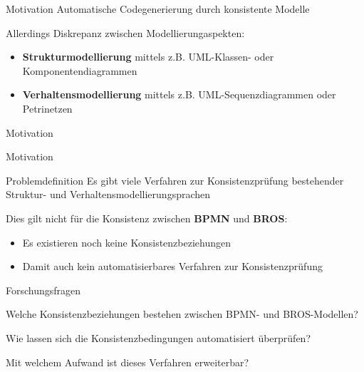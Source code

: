 \begin{frame}{Motivation}
  Automatische Codegenerierung durch konsistente Modelle

  Allerdings Diskrepanz zwischen Modellierungaspekten:

  \begin{itemize}
    \item \textbf{Strukturmodellierung} mittels z.B. UML-Klassen- oder Komponentendiagrammen 

    \item \textbf{Verhaltensmodellierung} mittels z.B. UML-Sequenzdiagrammen oder Petrinetzen
  \end{itemize}
\end{frame}
\begin{frame}{Motivation}
  
\end{frame}
\begin{frame}{Motivation}
  
\end{frame}

\begin{frame}{Problemdefinition}
  Es gibt viele Verfahren zur Konsistenzprüfung bestehender Struktur- und Verhaltensmodellierungsprachen

  Dies gilt nicht für die Konsistenz zwischen \textbf{BPMN} und \textbf{BROS}:

  \begin{itemize}
    \item Es existieren noch keine Konsistenzbeziehungen

    \item Damit auch kein automatisierbares Verfahren zur Konsistenzprüfung
  \end{itemize}
\end{frame}

\begin{frame}{Forschungsfragen}
  \begin{description}[4cm]
    \item[F1] Welche Konsistenzbeziehungen bestehen zwischen BPMN- und BROS-Modellen?

    \item[F2] Wie lassen sich die Konsistenzbedingungen automatisiert überprüfen?

    \item[F3] Mit welchem Aufwand ist dieses Verfahren erweiterbar?
  \end{description}
\end{frame}
